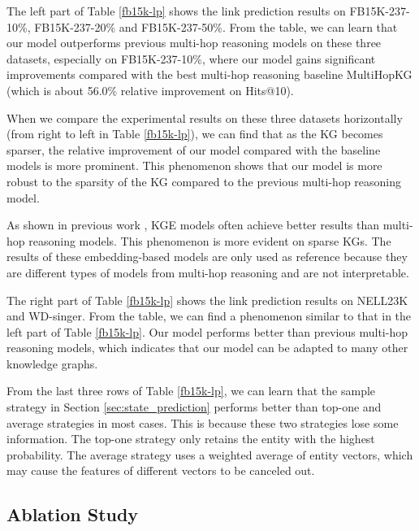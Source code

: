 \documentclass[11pt,a4paper]{article}
\begin{document}
The left part of Table \ref{fb15k-lp} shows the link prediction results on FB15K-237-10\%, FB15K-237-20\% and FB15K-237-50\%. From the table, we can learn that our model outperforms previous multi-hop reasoning models on these three datasets, especially on FB15K-237-10\%, where our model gains significant improvements compared with the best multi-hop reasoning baseline MultiHopKG (which is about 56.0\% relative improvement on Hits@10). 

When we compare the experimental results on these three datasets horizontally (from right to left in Table \ref{fb15k-lp}), we can find that as the KG becomes sparser, the relative improvement of our model compared with the baseline models is more prominent. This phenomenon shows that our model is more robust to the sparsity of the KG compared to the previous multi-hop reasoning model. 

As shown in previous work \cite{MultiHop, CPL}, KGE models often achieve better results than multi-hop reasoning models. This phenomenon is more evident on sparse KGs. The results of these embedding-based models are only used as reference because they are different types of models from multi-hop reasoning and are not interpretable.

The right part of Table \ref{fb15k-lp} shows the link prediction results on NELL23K and WD-singer. From the table, we can find a phenomenon similar to that in the left part of Table \ref{fb15k-lp}. Our model performs better than previous multi-hop reasoning models, which indicates that our model can be adapted to many other knowledge graphs.

From the last three rows of Table \ref{fb15k-lp}, we can learn that the sample strategy in Section \ref{sec:state_prediction} performs better than top-one and average strategies in most cases. This is because these two strategies lose some information. The top-one strategy only retains the entity with the highest probability. The average strategy uses a weighted average of entity vectors, which may cause the features of different vectors to be canceled out.

\subsection{Ablation Study}
\end{document}
